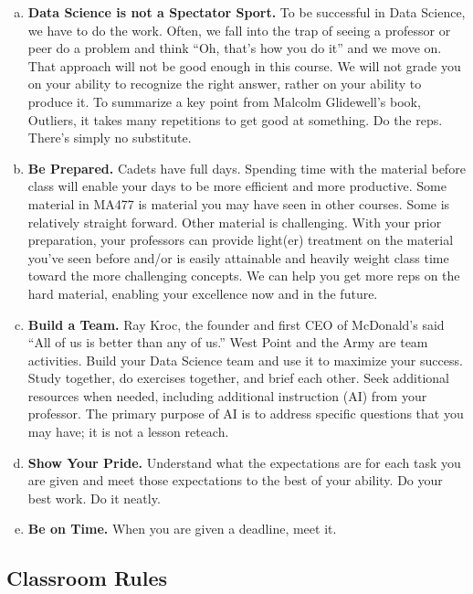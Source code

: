 \documentclass[11pt]{article}
\theoremstyle{plain}
\theoremstyle{definition}
\begin{document}
\begin{enumerate}[a.]
\item {\bf Data Science is not a Spectator Sport.} To be successful in Data Science, we have to do the work. Often, we fall into the trap of seeing a professor or peer do a problem and think “Oh, that’s how you do it” and we move on. That approach will not be good enough in this course. We will not grade you on your ability to recognize the right answer, rather on your ability to produce it. To summarize a key point from Malcolm Glidewell’s book, Outliers, it takes many repetitions to get good at something. Do the reps. There’s simply no substitute.

\item {\bf Be Prepared.} Cadets have full days. Spending time with the material before class will enable your days to be more efficient and more productive. Some material in MA477 is material you may have seen in other courses. Some is relatively straight forward. Other material is challenging. With your prior preparation, your professors can provide light(er) treatment on the material you’ve seen before and/or is easily attainable and heavily weight class time toward the more challenging concepts. We can help you get more reps on the hard material, enabling your excellence now and in the future.

\item {\bf Build a Team.} Ray Kroc, the founder and first CEO of McDonald’s said “All of us is better than any of us.” West Point and the Army are team activities. Build your Data Science team and use it to maximize your success. Study together, do exercises together, and brief each other. Seek additional resources when needed, including additional instruction (AI) from your professor. The primary purpose of AI is to address specific questions that you may have; it is not a lesson reteach.

\item {\bf Show Your Pride.} Understand what the expectations are for each task you are given and meet those expectations to the best of your ability. Do your best work. Do it neatly. 

\item {\bf Be on Time.}  When you are given a deadline, meet it.
\end{enumerate}


\subsection{Classroom Rules}
\end{document}
